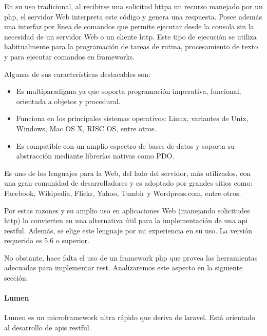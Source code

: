 En su uso tradicional, al recibirse una solicitud \gls{http}a un recurso manejado por un  \gls{php}, el servidor Web interpreta este código y genera una respuesta. Posee además una interfaz por línea de comandos que permite ejecutar  desde la consola sin la necesidad de un servidor Web o un cliente \gls{http}. Este tipo de ejecución se utiliza habitualmente para la programación de tareas de rutina, procesamiento de texto y para ejecutar comandos en \glspl{framework}\cite{achour2017php}.

Algunas de sus características destacables son: 
\begin{itemize}
\item Es multiparadigma ya que soporta programación imperativa, funcional, orientada a objetos y procedural. 
\item Funciona en los principales sistemas operativos: Linux, variantes de Unix, Windows, Mac OS X, RISC OS, entre otros.
\item Es compatible con un amplio espectro de bases de datos y soporta su abstracción mediante librerías nativas como PDO.
\end{itemize}

Es uno de los lenguajes para la Web, del lado del servidor, más utilizados\cite{w3techs2017languages}, con una gran comunidad de desarrolladores y es adoptado por grandes sitios como: Facebook, Wikipedia, Flickr, Yahoo, Tumblr y Wordpress.com, entre otros.


Por estas razones y su amplio uso en aplicaciones Web (manejando solicitudes \gls{http}) lo convierten en una alternativa útil para la implementación de una \gls{api} \gls{restful}. Además, se elige este lenguaje por mi experiencia en su uso. La versión requerida es 5.6 o superior.

No obstante, hace falta el uso de un \gls{framework} \gls{php} que provea las herramientas adecuadas para implementar \gls{rest}. Analizaremos este aspecto en la siguiente sección.

\paragraph{Lumen}

Lumen es un \gls{microframework} ultra rápido que deriva de \gls{laravel}. Está orientado al desarrollo de \glspl{api} \gls{restful}. 

